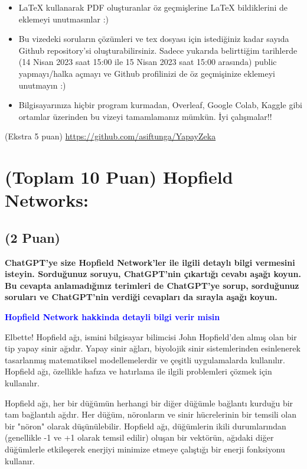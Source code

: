 \documentclass[11pt]{article}
\begin{document}
\begin{itemize}
    \item LaTeX kullanarak PDF oluşturanlar öz geçmişlerine LaTeX bildiklerini de eklemeyi unutmasınlar :)
    \item Bu vizedeki soruların çözümleri ve tex dosyası için istediğiniz kadar sayıda Github repository'si oluşturabilirsiniz. Sadece yukarıda belirttiğim tarihlerde (14 Nisan 2023 saat 15:00 ile 15 Nisan 2023 saat 15:00 arasında) public yapmayı/halka açmayı ve Github profilinizi de öz geçmişinize eklemeyi unutmayın :)
    \item Bilgisayarınıza hiçbir program kurmadan, Overleaf, Google Colab, Kaggle gibi ortamlar üzerinden bu vizeyi tamamlamanız mümkün. İyi çalışmalar!!
\end{itemize}

(Ekstra 5 puan) \url{https://github.com/asiftunga/YapayZeka}

\newpage
\section{(Toplam 10 Puan) Hopfield Networks:}

\subsection{(2 Puan)} \textbf{ChatGPT’ye size Hopfield Network’ler ile ilgili detaylı bilgi vermesini isteyin. Sorduğunuz soruyu, ChatGPT'nin çıkartığı cevabı aşağı koyun. Bu cevapta anlamadığınız terimleri de ChatGPT’ye sorup, sorduğunuz soruları ve ChatGPT’nin verdiği cevapları da sırayla aşağı koyun.}


\textbf{\textcolor{blue}{Hopfield Network hakkinda detayli bilgi verir misin}}


Elbette! Hopfield ağı, ismini bilgisayar bilimcisi John Hopfield'den almış olan bir tip yapay sinir ağıdır. Yapay sinir ağları, biyolojik sinir sistemlerinden esinlenerek tasarlanmış matematiksel modellemelerdir ve çeşitli uygulamalarda kullanılır. Hopfield ağı, özellikle hafıza ve hatırlama ile ilgili problemleri çözmek için kullanılır.

Hopfield ağı, her bir düğümün herhangi bir diğer düğümle bağlantı kurduğu bir tam bağlantılı ağdır. Her düğüm, nöronların ve sinir hücrelerinin bir temsili olan bir "nöron" olarak düşünülebilir. Hopfield ağı, düğümlerin ikili durumlarından (genellikle -1 ve +1 olarak temsil edilir) oluşan bir vektörün, ağıdaki diğer düğümlerle etkileşerek enerjiyi minimize etmeye çalıştığı bir enerji fonksiyonu kullanır.
\end{document}
